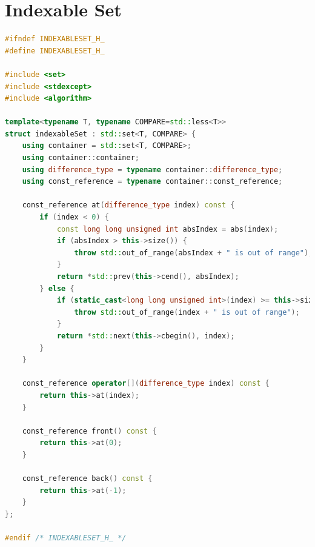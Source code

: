 \section{Indexable Set}
\begin{lstlisting}[language=C++]
#ifndef INDEXABLESET_H_
#define INDEXABLESET_H_

#include <set>
#include <stdexcept>
#include <algorithm>

template<typename T, typename COMPARE=std::less<T>>
struct indexableSet	: std::set<T, COMPARE> {
	using container	= std::set<T, COMPARE>;
	using container::container;
	using difference_type = typename container::difference_type;
	using const_reference = typename container::const_reference;

	const_reference	at(difference_type index) const {
		if (index < 0) {
			const long long unsigned int absIndex = abs(index);
			if (absIndex > this->size()) {
				throw std::out_of_range(absIndex + " is out of range");
			}
			return *std::prev(this->cend(), absIndex);
		} else {
			if (static_cast<long long unsigned int>(index) >= this->size()) {
				throw std::out_of_range(index + " is out of range");
			}
			return *std::next(this->cbegin(), index);
		}
	}

	const_reference	operator[](difference_type index) const {
		return this->at(index);
	}

	const_reference	front() const {
		return this->at(0);
	}

	const_reference	back() const {
		return this->at(-1);
	}
};

#endif /* INDEXABLESET_H_ */
\end{lstlisting}

